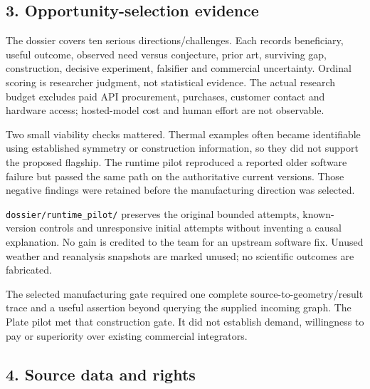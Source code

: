 \documentclass[
  10pt,
]{article}
\let\OriginalSubsection\subsection
\renewcommand{\subsection}{\needspace{6\baselineskip}\OriginalSubsection}
\begin{document}
\hypertarget{opportunity-selection-evidence}{%
\subsection{3. Opportunity-selection
evidence}\label{opportunity-selection-evidence}}

The dossier covers ten serious directions/challenges. Each records
beneficiary, useful outcome, observed need versus conjecture, prior art,
surviving gap, construction, decisive experiment, falsifier and
commercial uncertainty. Ordinal scoring is researcher judgment, not
statistical evidence. The actual research budget excludes paid API
procurement, purchases, customer contact and hardware access;
hosted-model cost and human effort are not observable.

Two small viability checks mattered. Thermal examples often became
identifiable using established symmetry or construction information, so
they did not support the proposed flagship. The runtime pilot reproduced
a reported older software failure but passed the same path on the
authoritative current versions. Those negative findings were retained
before the manufacturing direction was selected.

\texttt{dossier/\allowbreak{}runtime\_\allowbreak{}pilot/\allowbreak{}} preserves the original bounded
attempts, known-version controls and unresponsive initial attempts
without inventing a causal explanation. No gain is credited to the team
for an upstream software fix. Unused weather and reanalysis snapshots
are marked unused; no scientific outcomes are fabricated.

The selected manufacturing gate required one complete
source-to-geometry/result trace and a useful assertion beyond querying
the supplied incoming graph. The Plate pilot met that construction gate.
It did not establish demand, willingness to pay or superiority over
existing commercial integrators.

\hypertarget{source-data-and-rights}{%
\subsection{4. Source data and rights}\label{source-data-and-rights}}
\end{document}
